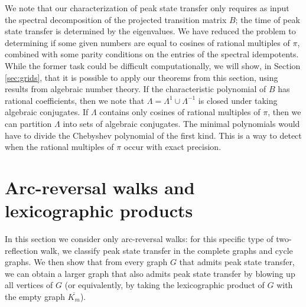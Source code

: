 \documentclass{article}
\numberwithin{equation}{section}
\begin{document}
We note that our characterization of peak state transfer only requires as input the spectral decomposition of the projected transition matrix $B$; the time of peak state transfer is determined by the eigenvalues. 
We have reduced the problem to determining if some given numbers are equal to cosines of rational multiples of $\pi$, combined with some parity conditions on the entries of the spectral idempotents. While the former task could be difficult computationally, we will show, in Section \ref{sec:grids}, that it is possible to apply our theorems from this section, using results from algebraic number theory. 
If the characteristic polynomial of $B$ has rational coefficients, then we note that $\Lambda = \Lambda^{1} \cup \Lambda^{-1}$ is closed under taking algebraic conjugates. If $\Lambda$ contains only cosines of rational multiples of $\pi$, then we can partition $\Lambda$ into sets of algebraic conjugates. The minimal polynomials would have to divide the Chebyshev polynomial of the first kind. This is a way to detect when the rational multiples of $\pi$ occur with exact precision. 









\section{Arc-reversal walks and lexicographic products}\label{sec:lex_products_arc_reversal}

In this section we consider only arc-reversal walks: for this specific type of two-reflection walk, we classify peak state transfer in the complete graphs and cycle graphs. We then show that from every graph $G$ that admits peak state transfer, we can obtain a larger graph that also admits peak state transfer by blowing up all vertices of $G$ (or equivalently, by taking the lexicographic product of $G$ with the empty graph $\overline{K_m}$).
\end{document}
